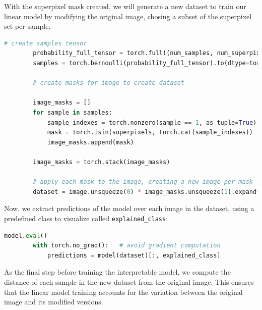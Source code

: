 With the superpixel mask created, we will generate a new dataset to train our linear model by modifying the original image, chosing a subset of the superpixel set per sample.

\begin{program}
    \centering

    \begin{lstlisting}[language=Python, style=wider]
        # create samples tensor
        probability_full_tensor = torch.full((num_samples, num_superpixels), probability)
        samples = torch.bernoulli(probability_full_tensor).to(dtype=torch.int)
        
        # create masks for image to create dataset
    
        image_masks = []
        for sample in samples:
            sample_indexes = torch.nonzero(sample == 1, as_tuple=True)
            mask = torch.isin(superpixels, torch.cat(sample_indexes))
            image_masks.append(mask)
        
        image_masks = torch.stack(image_masks)
        
        # apply each mask to the image, creating a new image per mask
        dataset = image.unsqueeze(0) * image_masks.unsqueeze(1).expand(-1, 3, -1, -1)
    \end{lstlisting}
\end{program}

Now, we extract predictions of the model over each image in the dataset, using a predefined class to visualize called \texttt{explained\_class}:

\begin{program}
    \centering

    \begin{lstlisting}[language=Python, style=wider]
        model.eval()
        with torch.no_grad():   # avoid gradient computation
            predictions = model(dataset)[:, explained_class]

    \end{lstlisting}
\end{program}

\newpage

As the final step before training the interpretable model, we compute the distance of each sample in the new dataset from the original image. 
This ensures that the linear model training accounts for the variation between the original image and its modified versions. 

